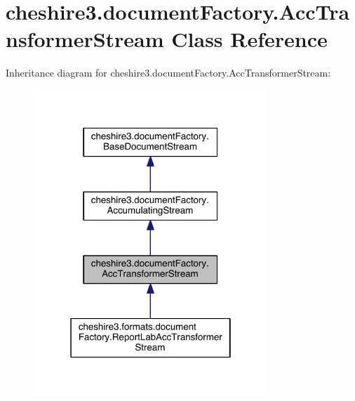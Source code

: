 \hypertarget{classcheshire3_1_1document_factory_1_1_acc_transformer_stream}{\section{cheshire3.\-document\-Factory.\-Acc\-Transformer\-Stream Class Reference}
\label{classcheshire3_1_1document_factory_1_1_acc_transformer_stream}
}


Inheritance diagram for cheshire3.\-document\-Factory.\-Acc\-Transformer\-Stream\-:
\nopagebreak
\begin{figure}[H]
\begin{center}
\leavevmode
\includegraphics[width=250pt]{classcheshire3_1_1document_factory_1_1_acc_transformer_stream__inherit__graph}
\end{center}
\end{figure}


